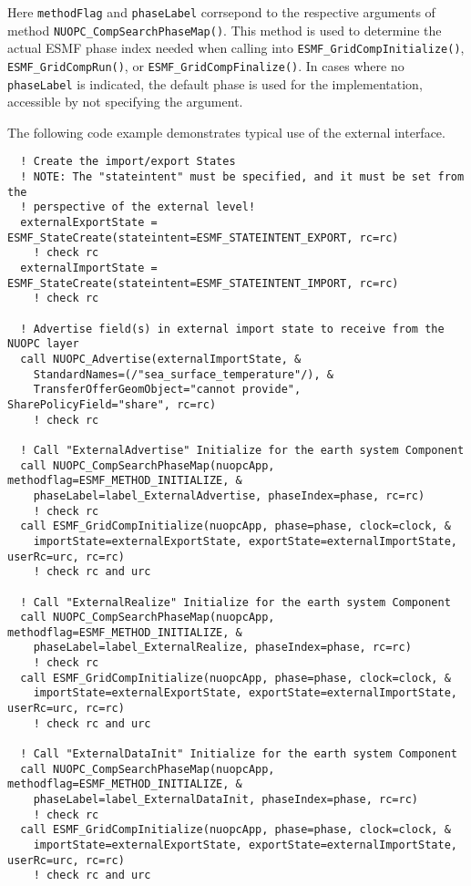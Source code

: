Here {\tt methodFlag} and {\tt phaseLabel} corrsepond to the respective arguments of method {\tt NUOPC\_CompSearchPhaseMap()}. This method is used to determine the actual ESMF phase index needed when calling into {\tt ESMF\_GridCompInitialize()}, {\tt ESMF\_GridCompRun()}, or {\tt ESMF\_GridCompFinalize()}. In cases where no {\tt phaseLabel} is indicated, the default phase is used for the implementation, accessible by not specifying the argument.

The following code example demonstrates typical use of the external interface.

\begin{verbatim}
  ! Create the import/export States
  ! NOTE: The "stateintent" must be specified, and it must be set from the
  ! perspective of the external level!
  externalExportState = ESMF_StateCreate(stateintent=ESMF_STATEINTENT_EXPORT, rc=rc)
    ! check rc
  externalImportState = ESMF_StateCreate(stateintent=ESMF_STATEINTENT_IMPORT, rc=rc)
    ! check rc

  ! Advertise field(s) in external import state to receive from the NUOPC layer
  call NUOPC_Advertise(externalImportState, &
    StandardNames=(/"sea_surface_temperature"/), &
    TransferOfferGeomObject="cannot provide", SharePolicyField="share", rc=rc)
    ! check rc

  ! Call "ExternalAdvertise" Initialize for the earth system Component
  call NUOPC_CompSearchPhaseMap(nuopcApp, methodflag=ESMF_METHOD_INITIALIZE, &
    phaseLabel=label_ExternalAdvertise, phaseIndex=phase, rc=rc)
    ! check rc
  call ESMF_GridCompInitialize(nuopcApp, phase=phase, clock=clock, &
    importState=externalExportState, exportState=externalImportState, userRc=urc, rc=rc)
    ! check rc and urc

  ! Call "ExternalRealize" Initialize for the earth system Component
  call NUOPC_CompSearchPhaseMap(nuopcApp, methodflag=ESMF_METHOD_INITIALIZE, &
    phaseLabel=label_ExternalRealize, phaseIndex=phase, rc=rc)
    ! check rc
  call ESMF_GridCompInitialize(nuopcApp, phase=phase, clock=clock, &
    importState=externalExportState, exportState=externalImportState, userRc=urc, rc=rc)
    ! check rc and urc

  ! Call "ExternalDataInit" Initialize for the earth system Component
  call NUOPC_CompSearchPhaseMap(nuopcApp, methodflag=ESMF_METHOD_INITIALIZE, &
    phaseLabel=label_ExternalDataInit, phaseIndex=phase, rc=rc)
    ! check rc
  call ESMF_GridCompInitialize(nuopcApp, phase=phase, clock=clock, &
    importState=externalExportState, exportState=externalImportState, userRc=urc, rc=rc)
    ! check rc and urc


\end{verbatim}
